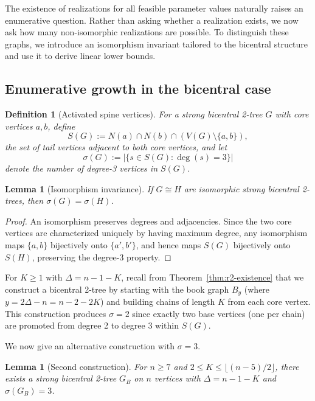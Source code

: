 \documentclass[12pt]{article}
\newtheorem{lemma}[theorem]{Lemma}
\newtheorem{definition}[theorem]{Definition}
\numberwithin{equation}{section}
\begin{document}
The existence of realizations for all feasible parameter values naturally raises an enumerative question. Rather than asking whether a realization exists, we now ask how many non-isomorphic realizations are possible. To distinguish these graphs, we introduce an isomorphism invariant tailored to the bicentral structure and use it to derive linear lower bounds.

\subsection{Enumerative growth in the bicentral case}

\begin{definition}[Activated spine vertices]
For a strong bicentral 2-tree $G$ with core vertices $a,b$, define
\[
S(G) := N(a) \cap N(b) \cap (V(G) \setminus \{a,b\}),
\]
the set of tail vertices adjacent to both core vertices, and let
\[
\sigma(G) := |\{s \in S(G) : \deg(s) = 3\}|
\]
denote the number of degree-3 vertices in $S(G)$.
\end{definition}

\begin{lemma}[Isomorphism invariance]\label{lem:sigma-invariant}
If $G \cong H$ are isomorphic strong bicentral 2-trees, then $\sigma(G) = \sigma(H)$.
\end{lemma}

\begin{proof}
An isomorphism preserves degrees and adjacencies. Since the two core vertices 
are characterized uniquely by having maximum degree, any isomorphism maps 
$\{a,b\}$ bijectively onto $\{a',b'\}$, and hence maps $S(G)$ bijectively 
onto $S(H)$, preserving the degree-3 property.
\end{proof}

For $K \geq 1$ with $\Delta = n-1-K$, recall from Theorem~\ref{thm:r2-existence} 
that we construct a bicentral 2-tree by starting with the book graph $B_y$ 
(where $y = 2\Delta - n = n - 2 - 2K$) and building chains of length $K$ from 
each core vertex. This construction produces $\sigma = 2$ since exactly two 
base vertices (one per chain) are promoted from degree 2 to degree 3 within $S(G)$.

We now give an alternative construction with $\sigma = 3$.

\begin{lemma}[Second construction]\label{lem:construction-B}
For $n \geq 7$ and $2 \leq K \leq \lfloor(n-5)/2\rfloor$, there exists a strong 
bicentral 2-tree $G_B$ on $n$ vertices with $\Delta = n-1-K$ and $\sigma(G_B) = 3$.
\end{lemma}
\end{document}
